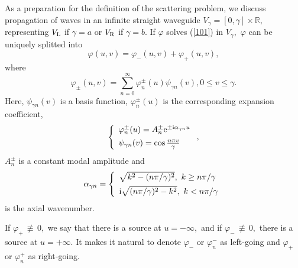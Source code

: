 \documentclass{svjour3}
\renewcommand{\phi}{\varphi}
\begin{document}
As a preparation for the definition of the scattering problem, we
discuss propagation of waves in an infinite straight waveguide
$V_{\gamma}=[0,\gamma]\times\mathbb{R},$ representing $V_{\rm L}$ if
$\gamma=a$ or $V_{\rm R}$ if $\gamma=b$. If $\phi$ solves (\ref{101}) in
$V_{\gamma},$ $\phi$ can be uniquely splitted into
\begin{equation}
  \phi(u,v)=\phi_{-}(u,v)+\phi_{+}(u,v), \label{103}
\end{equation}
where%
\begin{equation}\label{103.2}
  \phi_{\pm}(u,v)=\sum_{n=0}^{\infty}\phi_{n}^{\pm}(u)\psi
  _{\gamma n}(v),0\leq v\leq \gamma.
\end{equation}
Here, $\psi _{\gamma n}(v)$ is a basis function, $\phi_{n}^{\pm}(u)$
is the corresponding expansion coefficient,
\begin{equation}
  \left\{
    \begin{array}
      [c]{l}%
      \phi_{n}^{\pm}(u)=A_{n}^{\pm}\text{e}^{\pm\text{i}\alpha_{\gamma n}u}\\[1ex]%
      \psi
      _{\gamma n}(v)=\cos\frac{n\pi v}{\gamma}
    \end{array}
  \right.  , \label{103.4}%
\end{equation}
$A_{n}^{\pm}$ is a constant modal amplitude and
\begin{equation}
  \alpha_{\gamma n}=\left\{
    \begin{array}
      [c]{l}%
      \sqrt{k^{2}-(n\pi/\gamma)^{2}},\text{ }k\geq n\pi/\gamma\\[1ex]%
      \text{i}\sqrt{(n\pi/\gamma)^{2}-k^{2}},\text{ }k<n\pi/\gamma%
    \end{array}
  \right.   \label{106}%
\end{equation}
is the axial wavenumber.

If $\phi_{+}\,\not\equiv\, 0,$ we say that there is a source at
$u=-\infty,$ and if $\phi_{-}\,\not\equiv\, 0,$ there is a source at
$u=+\infty.$ It makes it natural to denote $\phi_{-}$ or
$\phi_{n}^{-}$ as left-going and $\phi_{+}$ or $\phi_{n}^{+}$ as
right-going.
\end{document}
